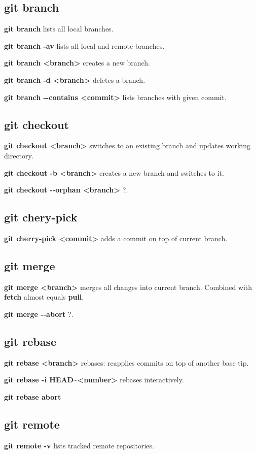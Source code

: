 \documentclass[a4paper, twoside, 8pt]{extarticle}
\begin{document}
\begin{multicols*}{3}
\subsection*{\dotfill git branch}
\textbf{git branch}	lists all local branches.

\textbf{git branch -av} lists all local and remote branches.

\textbf{git branch <branch>} creates a new branch.

\textbf{git branch -d <branch>} deletes a branch.

\textbf{git branch -{}-contains <commit>} lists branches with given commit.

\subsection*{\dotfill git checkout}
\textbf{git checkout <branch>} switches to an existing branch and updates working directory.

\textbf{git checkout -b <branch>} creates a new branch and switches to it.

\textbf{git checkout -{}-orphan <branch>} ?.

\subsection*{\dotfill git chery-pick}
\textbf{git cherry-pick <commit>} adds a commit on top of current branch.

\subsection*{\dotfill git merge}
\textbf{git merge <branch>} merges all changes into current branch.
Combined with \textbf{fetch} almost equals \textbf{pull}.

\textbf{git merge -{}-abort} ?.

\subsection*{\dotfill git rebase}
\textbf{git rebase <branch>} rebases: reapplies commits on top of another base tip.

\textbf{git rebase -i HEAD\textasciitilde<number>} rebases interactively.

\textbf{git rebase abort}

\subsection*{\dotfill git remote}
\textbf{git remote -v} lists tracked remote repositories.


\end{multicols*}
\end{document}
